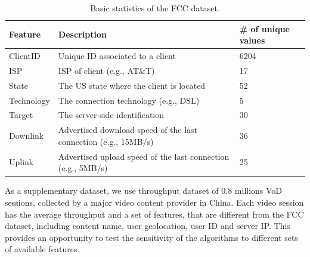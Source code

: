 \begin{table}[t]
    \begin{tabular}{p{2.2cm}|p{8.0cm}|p{3.2cm}}
 {\bf Feature} & {\bf Description}                        & {\bf \# of unique values} \\ \hline\hline
    ClientID   & Unique ID associated to a client         & 6204                \\
    ISP        & ISP of client (e.g., AT\&T)              & 17                  \\
    State      & The US state where the client is located & 52                  \\
    Technology & The connection technology (e.g., DSL)   & 5                   \\
    Target     & The server-side identification     & 30 \\
    Downlink   & Advertised download speed of the last connection (e.g., 15MB/s) & 36 \\
    Uplink     & Advertised upload speed of the last connection  (e.g., 5MB/s)   & 25 \\
    \end{tabular}
\caption{Basic statistics of the FCC dataset.}
\label{tab:fcc-stats}
\end{table}


 As a supplementary dataset, we use throughput dataset of 0.8 millions VoD sessions, collected by a major video content provider in China. Each video session has the average throughput and a set of features, that are different from the FCC dataset, including content name, user geolocation, user ID and server IP. This provides an opportunity to test the sensitivity of the algorithms to different sets of available features. %




